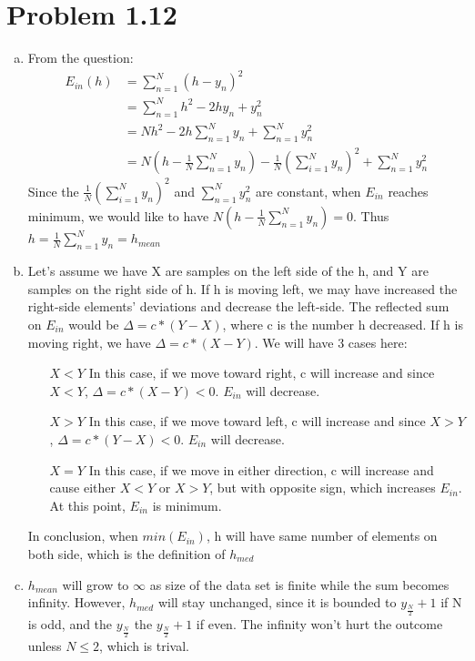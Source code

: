 \documentclass{article}
\def\math#1{$#1$}
\begin{document}
\section{Problem 1.12}

\begin{enumerate}[a)]
    \item From the question: 
        \begin{equation}
            \begin{split}
                E_{in}(h) &= \sum_{n = 1}^N(h - y_n)^2 \\
                &= \sum_{n = 1}^N h^2 - 2hy_n + y_n^2 \\
                &= Nh^2 - 2h\sum_{n = 1}^N y_n + \sum_{n = 1}^N y_n^2 \\
                &= N(h - \frac{1}{N}\sum_{n = 1}^N y_n) - \frac{1}{N}(\sum_{i = 1}^N y_n)^2 + \sum_{n = 1}^N y_n^2
            \end{split}
        \end{equation}
    Since the \math{\frac{1}{N}(\sum_{i = 1}^N y_n)^2} and \math{\sum_{n = 1}^N y_n^2} are constant, when \math{E_{in}} reaches minimum, we would like to have \math{N(h - \frac{1}{N}\sum_{n = 1}^N y_n) = 0}. Thus \math{h = \frac{1}{N}\sum_{n = 1}^N y_n = h_{mean}}
    \item Let's assume we have X are samples on the left side of the h, and Y are samples on the right side of h. If h is moving left, we may have increased the right-side elements' deviations and decrease the left-side. The reflected sum on \math{E_{in}} would be \math{\Delta = c * (Y - X)}, where c is the number h decreased. If h is moving right, we have \math{\Delta = c * (X - Y)}. We will have 3 cases here:
        \begin{itemize}
            \item [\math{X < Y}] In this case, if we move toward right, c will increase and since \math{X < Y}, \math{\Delta = c * (X - Y) < 0}. \math{E_{in}} will decrease.
            \item [\math{X > Y}] In this case, if we move toward left, c will increase and since \math{X > Y}, \math{\Delta = c * (Y - X) < 0}. \math{E_{in}} will decrease.
            \item [\math{X = Y}] In this case, if we move in either direction, c will increase and cause either \math{X < Y} or \math{X > Y}, but with opposite sign, which increases \math{E_{in}}. At this point, \math{E_{in}} is minimum.
        \end{itemize}
    In conclusion, when \math{min(E_{in})}, h will have same number of elements on both side, which is the definition of \math{h_{med}}
    \item \math{h_{mean}} will grow to \math{\infty} as size of the data set is finite while the sum becomes infinity. However, \math{h_{med}} will stay unchanged, since it is bounded to \math{y_\frac{N}{2} + 1} if N is odd, and the \math{y_\frac{N}{2}} the \math{y_\frac{N}{2} + 1} if even. The infinity won't hurt the outcome unless \math{N \leq 2}, which is trival. 
\end{enumerate}
\end{document}
